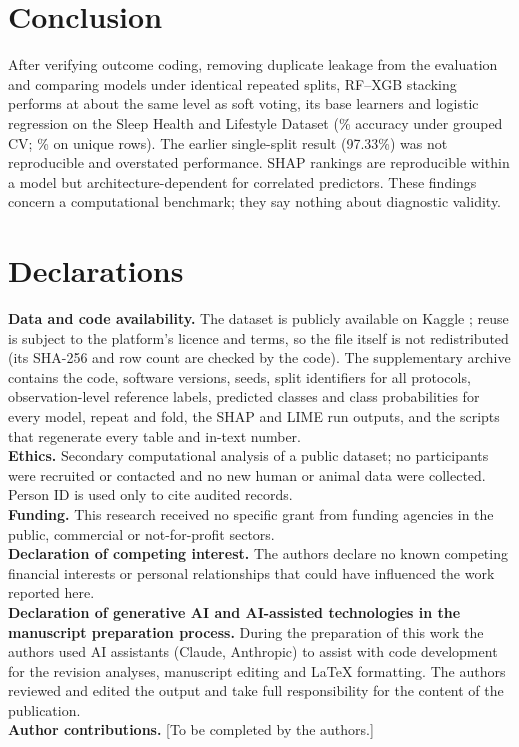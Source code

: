 \documentclass[11pt,a4paper]{article}
\begin{document}
\section{Conclusion}
After verifying outcome coding, removing duplicate leakage from the evaluation and comparing models under identical repeated splits, RF--XGB stacking performs at about the same level as soft voting, its base learners and logistic regression on the Sleep Health and Lifestyle Dataset (\AccStackG\% accuracy under grouped CV; \AccStackD\% on unique rows). The earlier single-split result (97.33\%) was not reproducible and overstated performance. SHAP rankings are reproducible within a model but architecture-dependent for correlated predictors. These findings concern a computational benchmark; they say nothing about diagnostic validity.

\section*{Declarations}
\small
\textbf{Data and code availability.} The dataset is publicly available on Kaggle \citep{kaggle}; reuse is subject to the platform's licence and terms, so the file itself is not redistributed (its SHA-256 and row count are checked by the code). The supplementary archive contains the code, software versions, seeds, split identifiers for all protocols, observation-level reference labels, predicted classes and class probabilities for every model, repeat and fold, the SHAP and LIME run outputs, and the scripts that regenerate every table and in-text number.\\
\textbf{Ethics.} Secondary computational analysis of a public dataset; no participants were recruited or contacted and no new human or animal data were collected. Person ID is used only to cite audited records.\\
\textbf{Funding.} This research received no specific grant from funding agencies in the public, commercial or not-for-profit sectors.\\
\textbf{Declaration of competing interest.} The authors declare no known competing financial interests or personal relationships that could have influenced the work reported here.\\
\textbf{Declaration of generative AI and AI-assisted technologies in the manuscript preparation process.} During the preparation of this work the authors used AI assistants (Claude, Anthropic) to assist with code development for the revision analyses, manuscript editing and LaTeX formatting. The authors reviewed and edited the output and take full responsibility for the content of the publication.\\
\textbf{Author contributions.} [To be completed by the authors.]
\normalsize
\end{document}
